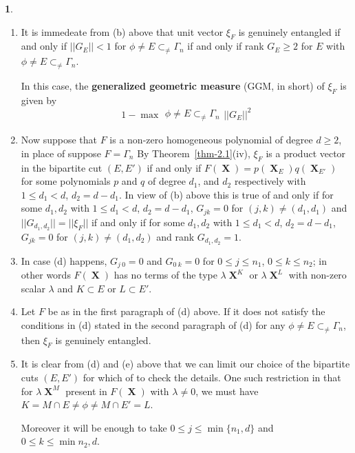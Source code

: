 \documentclass[a4paper,12pt]{article}
\DeclareMathOperator{\x}{\mathrm{X}}
\theoremstyle{definition}
\theoremstyle{underlinethm}
\theoremstyle{definition}
\newtheorem{subsubsec}{}[subsection]
\begin{document}
\begin{subsubsec}
\begin{enumerate}[label = (\alph*)]
\item It is immedeate from (b) above that unit vector $\xi_{F}$ is genuinely entangled if and only if $||G_{E}|| < 1 $ for $\phi \neq E \subset_{\neq} \Gamma_{n}$ if and only if rank $G_{E} \geq 2$ for $E$ with $\phi \neq E \subset_{\neq} \Gamma_{n}$.

In this case, the \textbf{generalized geometric measure} (GGM, in short) of $\xi_{F}$ is given by 
\begin{equation}
1 -\max\substack{\phi \neq E \subset_{\neq}\Gamma_{n}}|| G_{E}||^{2}\tag{4.20}\label{eq-4.20}
\end{equation} 

\item Now suppose that $F$ is a non-zero homogeneous polynomial of degree $d \geq 2$, in place of suppose $F = \Gamma_{n}$ By Theorem~\eqref{thm-2.1}(iv), $\xi_{F}$ is a product vector in the bipartite cut $(E, E')$ if and only if $F(\boldsymbol{\x}) = p(\boldsymbol{\x}_{E})q(\boldsymbol{\x}_{E'})$ for some polynomials $p$
 and $q$ of degree $d_{1}$, and $d_{2}$ respectively with $1 \leq d_{1} < d$, $d_{2}=d-d_{1}$. In view of (b) above this is true of and only if for some $d_{1}, d_{2}$ with $1 \leq d_{1} < d$, $d_{2}=d-d_{1}$, $G_{jk} =0$ for $(j,k) \neq (d_{1}, d_{1})$ and $||G_{d_{1}, d_{2}}||=|| \xi_{F}||$ if and only if for some $d_{1}, d_{2}$ with $1 \leq d_{1} < d$, $d_{2}=d-d_{1}$, $G_{jk}=0$ for $(j,k) \neq (d_{1}, d_{2})$ and rank $G_{d_{1},d_{2}}=1$.
 
 \item In case (d) happens, $G_{j~0} =0$ and $G_{0~k}=0$ for $0 \leq j \leq n_{1}$, $0 \leq k \leq n_{2}$; in other words $F(\boldsymbol{\x})$ has no terms of the type $\lambda \boldsymbol{\x}^{K}$ or $\lambda \boldsymbol{\x}^{L}$ with non-zero scalar $\lambda$ and $K \subset E$ or $L \subset E'$.
 
 \item Let $F$ be as in the first paragraph of (d) above. If it does not satisfy the conditions in (d) stated in the second paragraph of (d) for any $\phi \neq E \subset_{\neq} \Gamma_{n}$, then $\xi_{F}$ is genuinely entangled.
 
 \item It is clear from (d) and (e) above that we can limit our choice of the bipartite cuts $(E, E')$ for which of to check the details. One such restriction in that for $\lambda\boldsymbol{\x}^{M}$ present in $F(\boldsymbol{\x})$ with $\lambda\neq 0$, we must have $K = M \cap E \neq \phi \neq M \cap E' =L$. 
 
 Moreover it will be enough to take $0 \leq j \leq \min \{n_{1}, d\}$ and $0 \leq k \leq \min {n_{2}, d}$. 

\end{enumerate}
\end{subsubsec}
\end{document}
